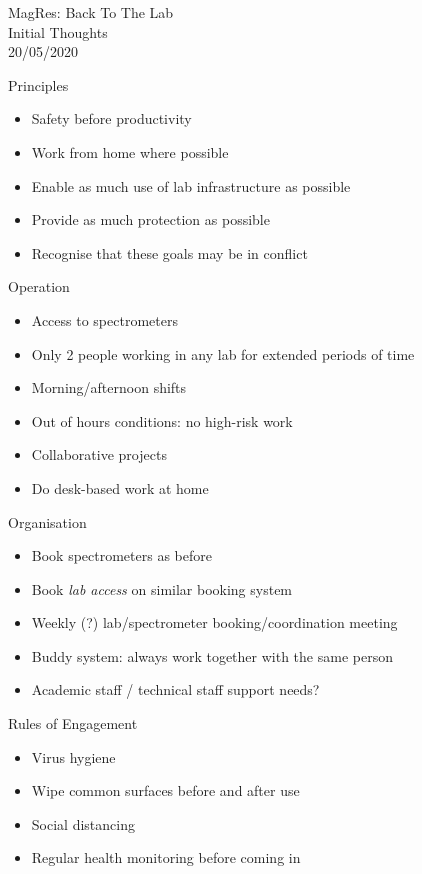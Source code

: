 \documentclass[aspectratio=169,handout]{beamer}
\begin{document}
\setmainfont{Source Sans Pro}
\setsansfont{Source Sans Pro}

\begin{frame}{}
\vfill
\begin{center}
	{\Large MagRes: Back To The Lab} \\[2cm]
	Initial Thoughts \\
	20/05/2020
\end{center}
\vfill
\end{frame}

\begin{frame}{Principles}
	\begin{itemize}
		\item<+-> Safety before productivity
		\item<+-> Work from home where possible
		\item<+-> Enable as much use of lab infrastructure as possible
		\item<+-> Provide as much protection as possible
		\item<+-> Recognise that these goals may be in conflict
	\end{itemize}
\end{frame}

\begin{frame}{Operation}
	\begin{itemize}
		\item<+-> Access to spectrometers
		\item<+-> Only 2 people working in any lab for extended periods of time
		\item<+-> Morning/afternoon shifts
		\item<+-> Out of hours conditions: no high-risk work
		\item<+-> Collaborative projects
		\item<+-> Do desk-based work at home
	\end{itemize}
\end{frame}

\begin{frame}{Organisation}
	\begin{itemize}
		\item<+-> Book spectrometers as before
		\item<+-> Book \emph{lab access} on similar booking system
		\item<+-> Weekly (?) lab/spectrometer booking/coordination meeting
		\item<+-> Buddy system: always work together with the same person
		\item<+-> Academic staff / technical staff support needs?
	\end{itemize}
\end{frame}


\begin{frame}{Rules of Engagement}
	\begin{itemize}
		\item<+-> Virus hygiene
		\item<+-> Wipe common surfaces before and after use
		\item<+-> Social distancing
		\item<+-> Regular health monitoring before coming in
	\end{itemize}
\end{frame}
\end{document}
